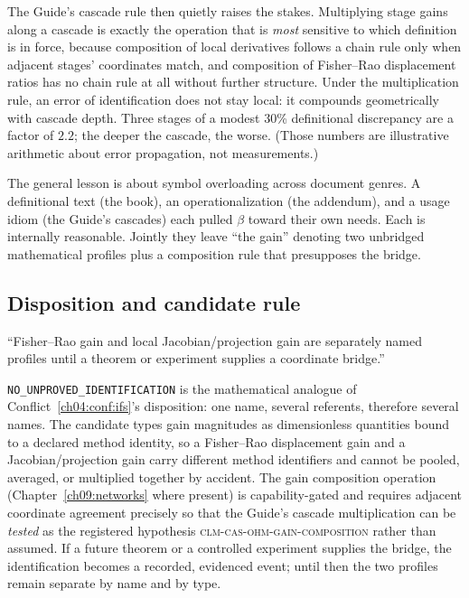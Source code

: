 The Guide's cascade rule then quietly raises the stakes. Multiplying stage
gains along a cascade is exactly the operation that is \emph{most} sensitive
to which definition is in force, because composition of local derivatives
follows a chain rule only when adjacent stages' coordinates match, and
composition of Fisher--Rao displacement ratios has no chain rule at all
without further structure. Under the multiplication rule, an error of
identification does not stay local: it compounds geometrically with cascade
depth. Three stages of a modest 30\% definitional discrepancy are a factor of
$2.2$; the deeper the cascade, the worse. (Those numbers are illustrative
arithmetic about error propagation, not measurements.)

The general lesson is about symbol overloading across document genres. A
definitional text (the book), an operationalization (the addendum), and a
usage idiom (the Guide's cascades) each pulled $\beta$ toward their own
needs. Each is internally reasonable. Jointly they leave ``the gain''
denoting two unbridged mathematical profiles plus a composition rule that
presupposes the bridge.

\subsection{Disposition and candidate rule}

\begin{ruleenv}\label{ch04:rule:gain}
``Fisher--Rao gain and local Jacobian/projection gain are separately named
profiles until a theorem or experiment supplies a coordinate bridge.''
\end{ruleenv}

\texttt{NO\_UNPROVED\_IDENTIFICATION} is the mathematical analogue of
Conflict~\ref{ch04:conf:ifs}'s disposition: one name, several referents,
therefore several names. The candidate types gain magnitudes as dimensionless
quantities bound to a declared method identity, so a Fisher--Rao displacement
gain and a Jacobian/projection gain carry different method identifiers and
cannot be pooled, averaged, or multiplied together by accident. The gain
composition operation (Chapter~\ref{ch09:networks} where present) is
capability-gated and requires adjacent coordinate agreement precisely so that
the Guide's cascade multiplication can be \emph{tested} as the registered
hypothesis \textsc{clm-cas-ohm-gain-composition} rather than assumed. If a
future theorem or a controlled experiment supplies the bridge, the
identification becomes a recorded, evidenced event; until then the two
profiles remain separate by name and by type.

